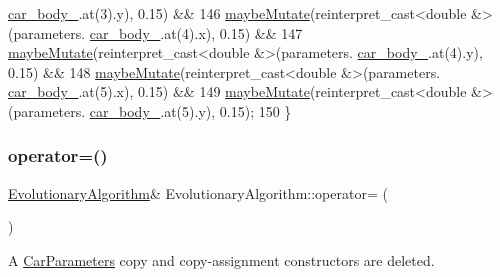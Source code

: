 \begin{DoxyCode}
      \hyperlink{classCarParameters_a304345d7fd7771c87421e87785bce810}{car\_body\_}.at(3).y), 0.15) &&
146            \hyperlink{classEvolutionaryAlgorithm_a19c58cc0434d314fb5378e3674546988}{maybeMutate}(reinterpret\_cast<double &>(parameters.
      \hyperlink{classCarParameters_a304345d7fd7771c87421e87785bce810}{car\_body\_}.at(4).x), 0.15) &&
147            \hyperlink{classEvolutionaryAlgorithm_a19c58cc0434d314fb5378e3674546988}{maybeMutate}(reinterpret\_cast<double &>(parameters.
      \hyperlink{classCarParameters_a304345d7fd7771c87421e87785bce810}{car\_body\_}.at(4).y), 0.15) &&
148            \hyperlink{classEvolutionaryAlgorithm_a19c58cc0434d314fb5378e3674546988}{maybeMutate}(reinterpret\_cast<double &>(parameters.
      \hyperlink{classCarParameters_a304345d7fd7771c87421e87785bce810}{car\_body\_}.at(5).x), 0.15) &&
149            \hyperlink{classEvolutionaryAlgorithm_a19c58cc0434d314fb5378e3674546988}{maybeMutate}(reinterpret\_cast<double &>(parameters.
      \hyperlink{classCarParameters_a304345d7fd7771c87421e87785bce810}{car\_body\_}.at(5).y), 0.15);
150 \}
\end{DoxyCode}
\mbox{\label{classEvolutionaryAlgorithm_a4726d79d2cfc00b01f521a2fb8b87863}} 
\subsubsection{\texorpdfstring{operator=()}{operator=()}}
{\footnotesize\ttfamily \hyperlink{classEvolutionaryAlgorithm}{Evolutionary\+Algorithm}\& Evolutionary\+Algorithm\+::operator= (\begin{DoxyParamCaption}\item[{const \hyperlink{classEvolutionaryAlgorithm}{Evolutionary\+Algorithm} \&}]{ }\end{DoxyParamCaption})\hspace{0.3cm}{\ttfamily [delete]}}



A \hyperlink{classCarParameters}{Car\+Parameters} copy and copy-\/assignment constructors are deleted. 

\mbox{\label{classEvolutionaryAlgorithm_a8efaa380f6d1b9a2f8a6ad44e2d362e2}} 
